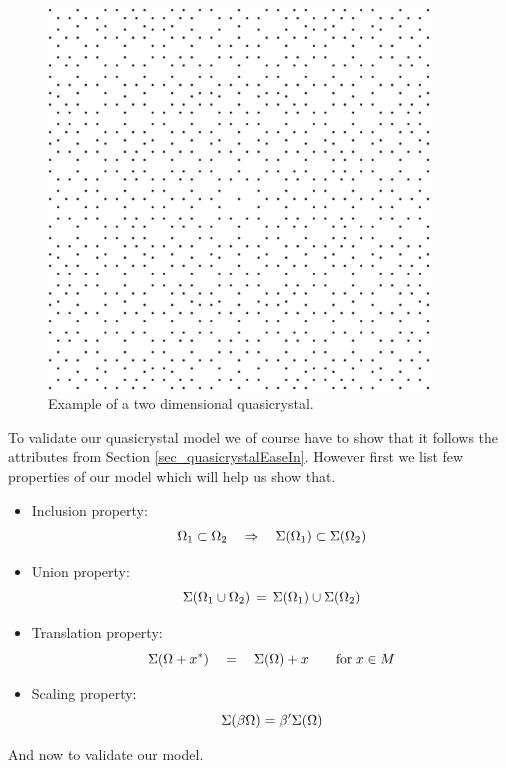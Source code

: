 \documentclass[text.tex]{subfiles}
\begin{document}
\begin{figure}[h]
\centering
\includegraphics[width=0.9\textwidth]{img/firstExample}
\caption{Example of a two dimensional quasicrystal.}
\label{fig_quasicrystalFirstExample}
\end{figure}

To validate our quasicrystal model we of course have to show that it follows the attributes from Section \ref{sec_quasicrystalEaseIn}. However first we list few properties of our model which will help us show that. 

\begin{itemize}
\item Inclusion property: $$\Omega_1\subset\Omega_2 \quad\Rightarrow\quad \Sigma(\Omega_1)\subset\Sigma(\Omega_2)$$
\item Union property: $$\Sigma(\Omega_1\cup\Omega_2) \,=\, \Sigma(\Omega_1)\cup\Sigma(\Omega_2)$$
\item Translation property: $$\Sigma(\Omega+x^\ast) \quad=\quad \Sigma(\Omega)+x\qquad \text{for}\; x\in M$$
\item Scaling property: $$\Sigma(\beta\Omega) = \beta'\Sigma(\Omega)$$
\end{itemize}

And now to validate our model. 
\end{document}
